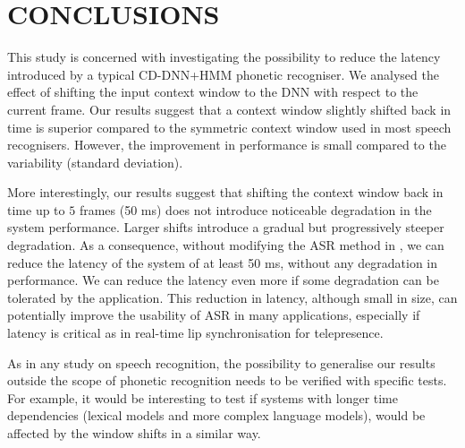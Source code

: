 \section{CONCLUSIONS}
\label{sec:conclusions}
This study is concerned with investigating the possibility to reduce the latency introduced by a typical CD-DNN+HMM phonetic recogniser.
We analysed the effect of shifting the input context window to the DNN with respect to the current frame.
Our results suggest that a context window slightly shifted back in time is superior compared to the symmetric context window used in most speech recognisers.
However, the improvement in performance is small compared to the variability (standard deviation).

More interestingly, our results suggest that shifting the context window back in time up to $5$ frames (50 ms) does not introduce noticeable degradation in the system performance.
Larger shifts introduce a gradual but progressively steeper degradation.
As a consequence, without modifying the ASR method in \cite{pdnn}, we can reduce the latency of the system of at least 50 ms, without any degradation in performance.
We can reduce the latency even more if some degradation can be tolerated by the application.
This reduction in latency, although small in size, can potentially improve the usability of ASR in many applications, especially if latency is critical as in real-time lip synchronisation for telepresence.

As in any study on speech recognition, the possibility to generalise our results outside the scope of phonetic recognition needs to be verified with specific tests. For example, it would be interesting to test if systems with longer time dependencies (lexical models and more complex language models), would be affected by the window shifts in a similar way.

